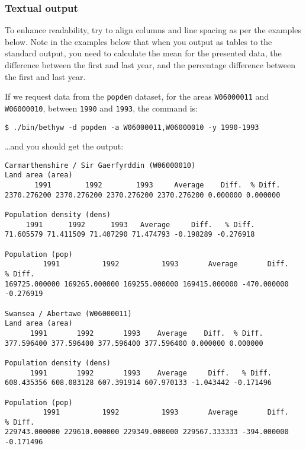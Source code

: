 \documentclass[a4paper]{article}
\begin{document}
\subsubsection*{Textual output}\label{sec:cwk output textual}
To enhance readability, try to align columns and line spacing as per the examples below. Note in the examples below that when you output as tables to the standard output, you need to calculate the mean for the presented data, the difference between the first and last year, and the percentage difference between the first and last year.

If we request data from the \texttt{popden} dataset, for the areas \texttt{W06000011} and \texttt{W06000010}, between \texttt{1990} and \texttt{1993}, the command is:
\begin{Verbatim}
$ ./bin/bethyw -d popden -a W06000011,W06000010 -y 1990-1993
\end{Verbatim}
\ldots and you should get the output:
\begin{lstlisting}[backgroundcolor = \color{lightgray}]
Carmarthenshire / Sir Gaerfyrddin (W06000010)
Land area (area) 
       1991        1992        1993     Average    Diff.  % Diff. 
2370.276200 2370.276200 2370.276200 2370.276200 0.000000 0.000000 

Population density (dens) 
     1991      1992      1993   Average     Diff.   % Diff. 
71.605579 71.411509 71.407290 71.474793 -0.198289 -0.276918 

Population (pop) 
         1991          1992          1993       Average       Diff.   % Diff. 
169725.000000 169265.000000 169255.000000 169415.000000 -470.000000 -0.276919 

Swansea / Abertawe (W06000011)
Land area (area) 
      1991       1992       1993    Average    Diff.  % Diff. 
377.596400 377.596400 377.596400 377.596400 0.000000 0.000000 

Population density (dens) 
      1991       1992       1993    Average     Diff.   % Diff. 
608.435356 608.083128 607.391914 607.970133 -1.043442 -0.171496 

Population (pop) 
         1991          1992          1993       Average       Diff.   % Diff. 
229743.000000 229610.000000 229349.000000 229567.333333 -394.000000 -0.171496 
\end{lstlisting}
\end{document}
